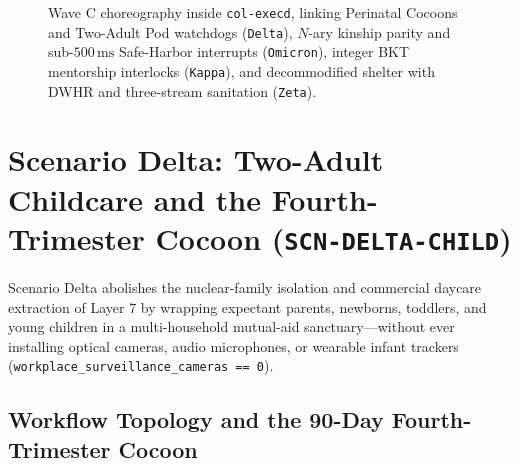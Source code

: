 \begin{figure}[htbp]
{%
}
\caption{Wave C choreography inside \texttt{col-execd}, linking Perinatal Cocoons and Two-Adult Pod watchdogs (\texttt{Delta}), $N$-ary kinship parity and sub-$500\,\mathrm{ms}$ Safe-Harbor interrupts (\texttt{Omicron}), integer BKT mentorship interlocks (\texttt{Kappa}), and decommodified shelter with DWHR and three-stream sanitation (\texttt{Zeta}).}
\label{fig:wave-c-choreography}
\end{figure}

\section{Scenario Delta: Two-Adult Childcare and the Fourth-Trimester Cocoon (\texttt{SCN-DELTA-CHILD})}
\label{sec:wave-c-delta}

Scenario Delta abolishes the nuclear-family isolation and commercial daycare extraction of
Layer 7 by wrapping expectant parents, newborns, toddlers, and young children in a
multi-household mutual-aid sanctuary---without ever installing optical cameras, audio
microphones, or wearable infant trackers (\texttt{workplace\_surveillance\_cameras == 0}).

\subsection{Workflow Topology and the 90-Day Fourth-Trimester Cocoon}

